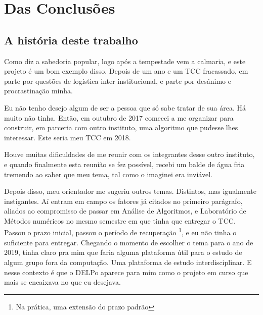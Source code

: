 \chapter{Das Conclusões}
\label{ch:conclusoes}
\minitoc


\section{A história deste trabalho}
\label{sec:about-it}

Como diz a sabedoria popular, logo após a tempestade vem a calmaria, e este projeto é um bom exemplo disso. Depois de um
ano e um TCC fracassado, em parte por questões de logística inter institucional, e parte por desânimo e procrastinação
minha.

Eu não tenho desejo algum de ser a pessoa que só sabe tratar de sua área. Há muito não tinha. Então, em outubro de 2017
comecei a me organizar para construir, em parceria com outro instituto, uma algoritmo que pudesse lhes interessar. Este
seria meu TCC em 2018.

Houve muitas dificuldades de me reunir com os integrantes desse outro instituto, e quando finalmente esta reunião se fez
possível, recebi um balde de água fria tremendo ao saber que meu tema, tal como o imaginei era inviável.

Depois disso, meu orientador me sugeriu outros temas. Distintos, mas igualmente instigantes. Aí entram em campo os fatores
já citados no primeiro parágrafo, aliados ao compromisso de passar em Análise de Algoritmos, e Laboratório de Métodos
numéricos no mesmo semestre em que tinha que entregar o TCC. Passou o prazo inicial, passou o período de recuperação
\footnote{Na prática, uma extensão do prazo padrão}, e eu não tinha o suficiente para entregar. Chegando o momento de
escolher o tema para o ano de 2019, tinha claro pra mim que faria alguma plataforma útil para o estudo de algum grupo
fora da computação. Uma plataforma de estudo interdisciplinar. E nesse contexto é que o DELPo aparece para mim como o
projeto em curso que mais se encaixava no que eu desejava.

